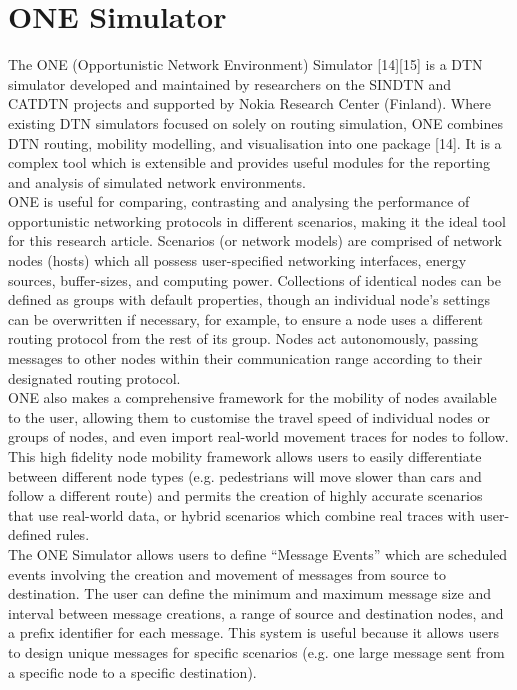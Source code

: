\documentclass{article}
\begin{document}
\section{ONE Simulator}
The ONE (Opportunistic Network Environment) Simulator [14][15] is a DTN simulator developed and maintained by researchers on the SINDTN and CATDTN projects and supported by Nokia Research Center (Finland). Where existing DTN simulators focused on solely on routing simulation, ONE combines DTN routing, mobility modelling, and visualisation into one package [14]. It is a complex tool which is extensible and provides useful modules for the reporting and analysis of simulated network environments.\\
\newline ONE is useful for comparing, contrasting and analysing the performance of opportunistic networking protocols in different scenarios, making it the ideal tool for this research article. Scenarios (or network models) are comprised of network nodes (hosts) which all possess user-specified networking interfaces, energy sources, buffer-sizes, and computing power. Collections of identical nodes can be defined as groups with default properties, though an individual node's settings can be overwritten if necessary, for example, to ensure a node uses a different routing protocol from the rest of its group. Nodes act autonomously, passing messages to other nodes within their communication range according to their designated routing protocol.\\ 
\newline ONE also makes a comprehensive framework for the mobility of nodes available to the user, allowing them to customise the travel speed of individual nodes or groups of nodes, and even import real-world movement traces for nodes to follow. This high fidelity node mobility framework allows users to easily differentiate between different node types (e.g. pedestrians will move slower than cars and follow a different route) and permits the creation of highly accurate scenarios that use real-world data, or hybrid scenarios which combine real traces with user-defined rules.\\
\newline The ONE Simulator allows users to define ``Message Events'' which are scheduled events involving the creation and movement of messages from source to destination. The user can define the minimum and maximum message size and interval between message creations, a range of source and destination nodes, and a prefix identifier for each message. This system is useful because it allows users to design unique messages for specific scenarios (e.g. one large message sent from a specific node to a specific destination).\\
\end{document}
